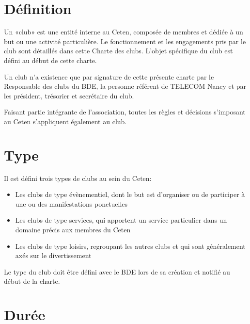\documentclass{article} %
\begin{document}
	\begin{multicols}{2}
		
		\section{Définition}
			
		{\small
			
			Un «club» est une entité interne au Ceten, composée de membres et
			dédiée à un but ou une activité particulière. Le fonctionnement et
			les engagements pris par le club sont détaillés dans cette Charte
			des clubs. L’objet spécifique du club est défini au début de cette
			charte.

			Un club n’a existence que par signature de cette présente charte par
			le Responsable des clubs du BDE, la personne référent de TELECOM
			Nancy et par les président, trésorier et secrétaire du club.

			Faisant partie intégrante de l’association, toutes les règles et
			décisions s’imposant au Ceten s’appliquent également au club.
			
			}

		\section{Type}
			
		{\small
		
			Il est défini trois types de clubs au sein du Ceten:
			\begin{itemize}
				\item Les clubs de type évènementiel, dont le but est
					d’organiser ou de participer à une ou des manifestations
					ponctuelles
				\item Les clubs de type services, qui apportent un service
					particulier dans un domaine précis aux membres du Ceten
				\item Les clubs de type loisirs, regroupant les autres clubs et
					qui sont généralement axés sur le divertissement
			\end{itemize}
			Le type du club doit être défini avec le BDE lors de sa création et
			notifié au début de la charte.
			
		}
		
		\section{Durée}
		
		{\small
			
}
\end{multicols}
\end{document}
